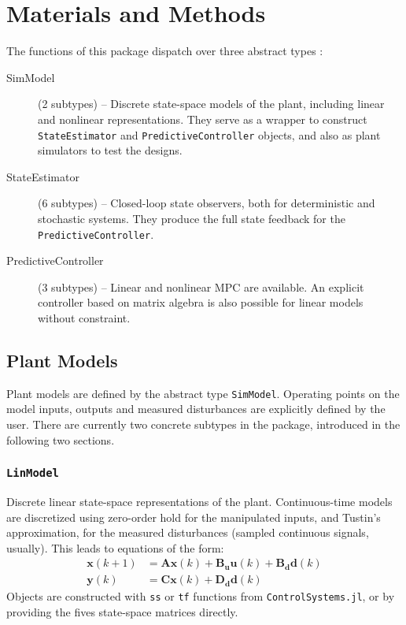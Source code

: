 
\section{Materials and Methods}

The functions of this package dispatch over three abstract types :
\begin{description}
    \item[SimModel] (2 subtypes) -- Discrete state-space models of the plant, including linear and nonlinear representations. They serve as a wrapper to construct \texttt{StateEstimator} and \texttt{PredictiveController} objects, and also as plant simulators to test the designs.
    \item[StateEstimator] (6 subtypes) -- Closed-loop state observers, both for deterministic and stochastic systems. They produce the full state feedback for the \texttt{PredictiveController}.
    \item[PredictiveController] (3 subtypes) -- Linear and nonlinear MPC are available. An explicit controller based on matrix algebra is also possible for linear models without constraint.
\end{description}

\subsection{Plant Models}

Plant models are defined by the abstract type \texttt{SimModel}. Operating points on the model inputs, outputs and measured disturbances are explicitly defined by the user. There are currently two concrete subtypes in the package, introduced in the following two sections.

\subsubsection{\textnormal{\texttt{LinModel}}}

Discrete linear state-space representations of the plant. Continuous-time models are discretized using zero-order hold for the manipulated inputs, and Tustin's approximation, for the measured disturbances (sampled continuous signals, usually). This leads to equations of the form:
\begin{subequations}
\begin{align}
    \mathbf{x}(k+1) &= \mathbf{A x}(k) + \mathbf{B_u u}(k) + \mathbf{B_d d}(k) \\
    \mathbf{y}(k)   &= \mathbf{C x}(k) + \mathbf{D_d d}(k)
\end{align}
\end{subequations}
Objects are constructed with \texttt{ss} or \texttt{tf} functions from \texttt{ControlSystems.jl}, or by providing the fives state-space matrices directly.

